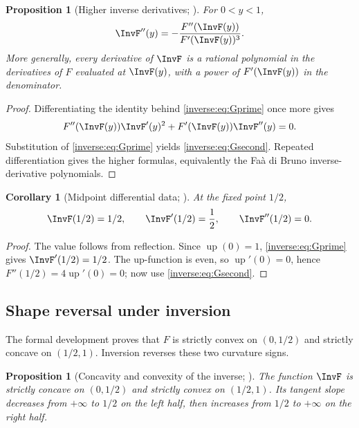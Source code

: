 \documentclass[11pt,oneside]{article}
\newtheorem{proposition}[theorem]{Proposition}
\newtheorem{corollary}[theorem]{Corollary}
\theoremstyle{definition}
\theoremstyle{remark}
\newcommand{\Up}{\operatorname{up}}
\begin{document}
\begin{proposition}[Higher inverse derivatives; \Derived]
\label{inverse:prop:inverse-higher-derivatives}
For $0<y<1$,
\begin{equation}
 \InvF''(y)
   =-\frac{F''(\InvF(y))}
           {F'(\InvF(y))^3}.
 \label{inverse:eq:Gsecond}
\end{equation}
More generally, every derivative of $\InvF$ is a rational polynomial in
the derivatives of $F$ evaluated at $\InvF(y)$, with a power of
$F'(\InvF(y))$ in the denominator.
\end{proposition}

\begin{proof}
Differentiating the identity behind \eqref{inverse:eq:Gprime} once more gives
\[
 F''(\InvF(y))\InvF'(y)^2+
 F'(\InvF(y))\InvF''(y)=0.
\]
Substitution of \eqref{inverse:eq:Gprime} yields \eqref{inverse:eq:Gsecond}.  Repeated
differentiation gives the higher formulas, equivalently the
Fa\`a di Bruno inverse-derivative polynomials.
\end{proof}

\begin{corollary}[Midpoint differential data; \Derived]
\label{inverse:cor:midpoint-inverse}
At the fixed point $1/2$,
\[
 \InvF(1/2)=1/2,\qquad
 \InvF'(1/2)=\frac12,\qquad
 \InvF''(1/2)=0.
\]
\end{corollary}

\begin{proof}
The value follows from reflection.  Since $\Up(0)=1$,
\eqref{inverse:eq:Gprime} gives $\InvF'(1/2)=1/2$.  The up-function is even, so
$\Up'(0)=0$, hence $F''(1/2)=4\Up'(0)=0$; now use
\eqref{inverse:eq:Gsecond}.
\end{proof}

\subsection{Shape reversal under inversion}

The formal development proves that $F$ is strictly convex on
$(0,1/2)$ and strictly concave on $(1/2,1)$.  Inversion reverses these
two curvature signs.

\begin{proposition}[Concavity and convexity of the inverse; \Derived]
\label{inverse:prop:inverse-shape}
The function $\InvF$ is strictly concave on $(0,1/2)$ and strictly convex
on $(1/2,1)$.  Its tangent slope decreases from $+\infty$ to $1/2$ on the
left half, then increases from $1/2$ to $+\infty$ on the right half.
\end{proposition}
\end{document}
